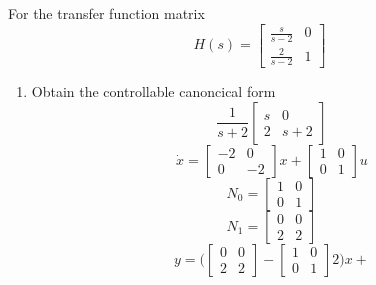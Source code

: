 \item For the transfer function matrix
  \begin{equation}
    H(s) =
    \begin{bmatrix}
      \frac s {s-2} & 0 \\
      \frac 2 {s-2} & 1 
    \end{bmatrix}
  \end{equation}
  \begin{enumerate}
  \item Obtain the controllable canoncical form \\
    \begin{equation}
      \frac 1 {s+2}
      \begin{bmatrix}
        s & 0 \\
        2 & s+2
      \end{bmatrix}
    \end{equation}
    \begin{equation}
      \dot x =
      \begin{bmatrix}
        -2 & 0 \\
        0 & -2
      \end{bmatrix}x +
      \begin{bmatrix}
        1 & 0 \\
        0 & 1 
      \end{bmatrix}u
    \end{equation}
    \begin{equation}
      N_0 =
      \begin{bmatrix}
        1 & 0 \\
        0 & 1
      \end{bmatrix}
    \end{equation}
    \begin{equation}
      N_1 =
      \begin{bmatrix}
        0 & 0 \\
        2 & 2
      \end{bmatrix}
    \end{equation}
    \begin{equation}
      y =
      \big (
      \begin{bmatrix}
        0 & 0 \\
        2 & 2
      \end{bmatrix} - 
      \begin{bmatrix}
        1 & 0 \\
        0 & 1
      \end{bmatrix}2
      \big )x +

\end{equation}
\end{enumerate}
